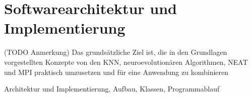 \chapter{Softwarearchitektur und Implementierung}
(TODO Anmerkung)
Das grundsätzliche Ziel ist, die in den Grundlagen vorgestellten Konzepte von den \ac{KNN}, neuroevolutionären Algorithmen, \ac{NEAT} und \ac{MPI} praktisch umzusetzen und für eine Anwendung zu kombinieren

Architektur und Implementierung, Aufbau, Klassen, Programmablauf

